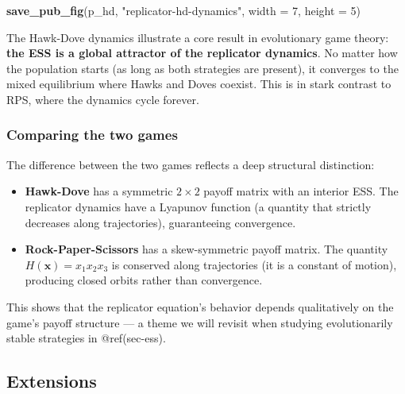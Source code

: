 \documentclass[
]{article}
\newenvironment{Shaded}{\begin{snugshade}}{\end{snugshade}}
\newcommand{\AttributeTok}[1]{\textcolor[rgb]{0.13,0.29,0.53}{#1}}
\newcommand{\DecValTok}[1]{\textcolor[rgb]{0.00,0.00,0.81}{#1}}
\newcommand{\FunctionTok}[1]{\textcolor[rgb]{0.13,0.29,0.53}{\textbf{#1}}}
\newcommand{\NormalTok}[1]{#1}
\newcommand{\StringTok}[1]{\textcolor[rgb]{0.31,0.60,0.02}{#1}}
\providecommand{\tightlist}{%
  \setlength{\itemsep}{0pt}\setlength{\parskip}{0pt}}
\begin{document}
\begin{Shaded}
\begin{Highlighting}[]
\FunctionTok{save\_pub\_fig}\NormalTok{(p\_hd, }\StringTok{"replicator{-}hd{-}dynamics"}\NormalTok{, }\AttributeTok{width =} \DecValTok{7}\NormalTok{, }\AttributeTok{height =} \DecValTok{5}\NormalTok{)}
\end{Highlighting}
\end{Shaded}

The Hawk-Dove dynamics illustrate a core result in evolutionary game
theory: \textbf{the ESS is a global attractor of the replicator
dynamics}. No matter how the population starts (as long as both
strategies are present), it converges to the mixed equilibrium where
Hawks and Doves coexist. This is in stark contrast to RPS, where the
dynamics cycle forever.

\subsubsection{Comparing the two games}\label{comparing-the-two-games}

The difference between the two games reflects a deep structural
distinction:

\begin{itemize}
\tightlist
\item
  \textbf{Hawk-Dove} has a symmetric \(2 \times 2\) payoff matrix with
  an interior ESS. The replicator dynamics have a Lyapunov function (a
  quantity that strictly decreases along trajectories), guaranteeing
  convergence.
\item
  \textbf{Rock-Paper-Scissors} has a skew-symmetric payoff matrix. The
  quantity \(H(\mathbf{x}) = x_1 x_2 x_3\) is conserved along
  trajectories (it is a constant of motion), producing closed orbits
  rather than convergence.
\end{itemize}

This shows that the replicator equation's behavior depends qualitatively
on the game's payoff structure --- a theme we will revisit when studying
evolutionarily stable strategies in @ref(sec-ess).

\subsection{Extensions}\label{extensions}
\end{document}
